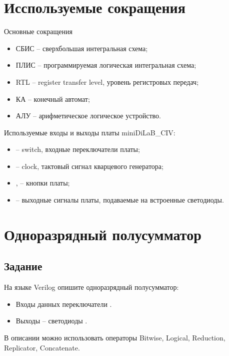 \section*{Исспользуемые сокращения}


\noindent Основные сокращения
\begin{itemize}
	\item СБИС -- сверхбольшая интегральная схема;
	\item ПЛИС -- программируемая логическая интегральная схема;
	\item RTL -- register transfer level, уровень регистровых передач;
	\item КА -- конечный автомат;
	\item АЛУ -- арифметическое логическое устройство.
\end{itemize}

\noindent Используемые входы и выходы платы miniDiLaB\_CIV:
\begin{itemize}
	\item {} -- switch, входные переключатели платы;
	\item {} -- clock, тактовый сигнал кварцевого генератора;
	\item {},  – кнопки платы;
	\item {} -- выходные сигналы платы, подаваемые на встроенные светодиоды.
\end{itemize}

\newpage

\section{Одноразрядный полусумматор}

\subsection{Задание}

На языке Verilog опишите одноразрядный полусумматор:
\begin{itemize}
	\item Входы данных переключатели .
	\item Выходы – светодиоды .
\end{itemize}
В описании можно использовать операторы Bitwise, Logical, Reduction, Replicator, Concatenate.

